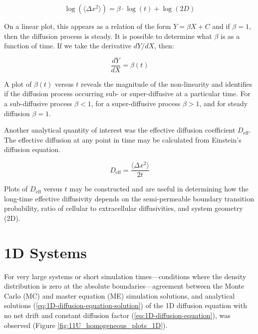 	\begin{equation}
		\log\left( \langle \Delta x^2 \rangle \right) = \beta \cdot \log(t) + \log(2D)
	\end{equation}	
	
	On a linear plot, this appears as a relation of the form $ Y = \beta X + C $ and if $ \beta = 1 $, then the diffusion process is steady. It is possible to determine what $ \beta $ is as a function of time. If we take the derivative $ dY/dX $, then:
	
	\begin{equation}
		\dfrac{dY}{dX} = \beta (t)
	\end{equation}
	
	A plot of $ \beta (t) $ versus $ t $ reveals the magnitude of the non-linearity and identifies if the diffusion process occurring sub- or super-diffusive at a particular time. For a sub-diffusive process $ \beta < 1 $, for a super-diffusive process $ \beta > 1 $, and for steady diffusion $ \beta = 1 $.
	
	Another analytical quantity of interest was the effective diffusion coefficient $ D_\textrm{eff} $. The effective diffusion at any point in time may be calculated from Einstein's diffusion equation.
	
	\begin{equation}
		D_\textrm{eff} = \dfrac{\langle \Delta x^2 \rangle}{2t}
	\end{equation}
	
	Plots of $ D_\textrm{eff} $ versus $ t $ may be constructed and are useful in determining how the long-time effective diffusivity depends on the semi-permeable boundary transition probability, ratio of cellular to extracellular diffusivities, and system geometry (2D).
	 
	
\section{1D Systems}
\label{sec:ra-1D}
	For very large systems or short simulation times---conditions where the density distribution is zero at the absolute boundaries---agreement between the Monte Carlo (MC) and master equation (ME) simulation solutions, and analytical solutions (\ref{eq:1D-diffusion-equation-solution}) of the 1D diffusion equation with no net drift and constant diffusion factor (\ref{eq:1D-diffusion-equation}), was observed (Figure \ref{fig:11U_homogeneous_plots_1D}). 

